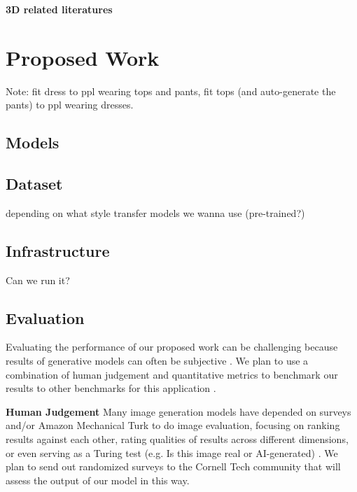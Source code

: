 \documentclass{article}
\begin{document}
\textbf{3D related literatures}



\section{Proposed Work}

Note: fit dress to ppl wearing tops and pants, fit tops (and auto-generate the pants) to ppl wearing dresses. 



\subsection{Models}



\subsection{Dataset}
depending on what style transfer models we wanna use (pre-trained?)

\subsection{Infrastructure}
Can we run it?


\subsection{Evaluation}
Evaluating the performance of our proposed work can be challenging because results of generative models can often be subjective \cite{borji2018eval}. We plan to use a combination of human judgement and quantitative metrics to benchmark our results to other benchmarks for this application \cite{todo}.

\textbf{Human Judgement} Many image generation models have depended on surveys and/or Amazon Mechanical Turk \cite{zhou2019hype} to do image evaluation, focusing on ranking results against each other, rating qualities of results across different dimensions, or even serving as a Turing test (e.g. Is this image real or AI-generated) \cite{salimans2016eval}. We plan to send out randomized surveys to the Cornell Tech community that will assess the output of our model in this way.
\end{document}

